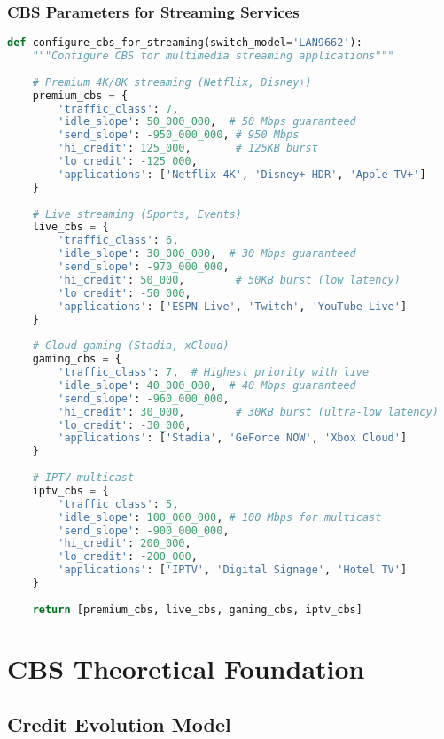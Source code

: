 \documentclass[10pt, journal, compsoc]{IEEEtran}
\begin{document}
\subsubsection{CBS Parameters for Streaming Services}

\begin{lstlisting}[language=python, caption=CBS Configuration for VOD Services]
def configure_cbs_for_streaming(switch_model='LAN9662'):
    """Configure CBS for multimedia streaming applications"""
    
    # Premium 4K/8K streaming (Netflix, Disney+)
    premium_cbs = {
        'traffic_class': 7,
        'idle_slope': 50_000_000,  # 50 Mbps guaranteed
        'send_slope': -950_000_000, # 950 Mbps
        'hi_credit': 125_000,       # 125KB burst
        'lo_credit': -125_000,
        'applications': ['Netflix 4K', 'Disney+ HDR', 'Apple TV+']
    }
    
    # Live streaming (Sports, Events)
    live_cbs = {
        'traffic_class': 6,
        'idle_slope': 30_000_000,  # 30 Mbps guaranteed
        'send_slope': -970_000_000,
        'hi_credit': 50_000,        # 50KB burst (low latency)
        'lo_credit': -50_000,
        'applications': ['ESPN Live', 'Twitch', 'YouTube Live']
    }
    
    # Cloud gaming (Stadia, xCloud)
    gaming_cbs = {
        'traffic_class': 7,  # Highest priority with live
        'idle_slope': 40_000_000,  # 40 Mbps guaranteed
        'send_slope': -960_000_000,
        'hi_credit': 30_000,        # 30KB burst (ultra-low latency)
        'lo_credit': -30_000,
        'applications': ['Stadia', 'GeForce NOW', 'Xbox Cloud']
    }
    
    # IPTV multicast
    iptv_cbs = {
        'traffic_class': 5,
        'idle_slope': 100_000_000, # 100 Mbps for multicast
        'send_slope': -900_000_000,
        'hi_credit': 200_000,
        'lo_credit': -200_000,
        'applications': ['IPTV', 'Digital Signage', 'Hotel TV']
    }
    
    return [premium_cbs, live_cbs, gaming_cbs, iptv_cbs]
\end{lstlisting}

\section{CBS Theoretical Foundation}
\label{sec:cbs_theory}

\subsection{Credit Evolution Model}
\end{document}
